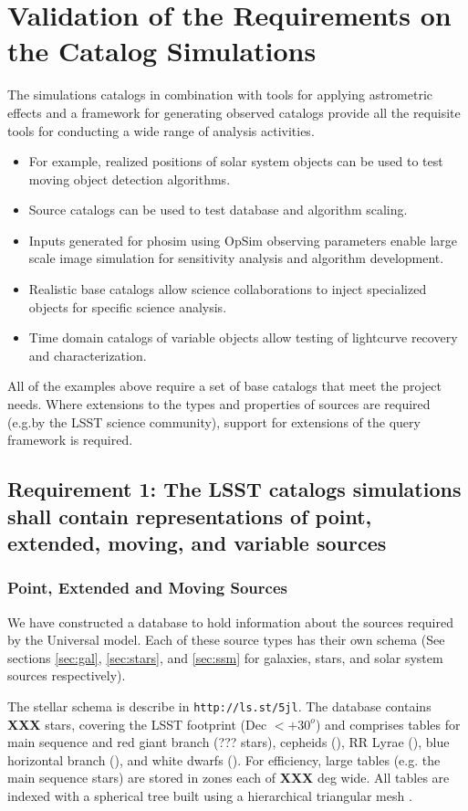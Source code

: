 \documentclass[]{article}
\begin{document}
{\section{Validation of the Requirements on the Catalog Simulations}
The simulations catalogs in combination with tools for applying astrometric effects and a 
framework for generating observed catalogs provide all the requisite tools for conducting a 
wide range of analysis activities.
\begin{itemize}
\item For example, realized positions of solar system objects can be used to test moving object detection algorithms.
\item Source catalogs can be used to test database and algorithm scaling.
\item Inputs generated for phosim using OpSim observing parameters enable large scale image simulation
for sensitivity analysis and algorithm development.
\item Realistic base catalogs allow science collaborations to inject specialized objects for specific science
analysis.
\item Time domain catalogs of variable objects allow testing of lightcurve recovery and characterization.
\end{itemize}

All of the examples above require a set of base catalogs that meet the project needs.  Where extensions to the types and
properties of sources are required (e.g.by the LSST science community), support for extensions of the query 
framework is required.  

\subsection{Requirement 1: The LSST catalogs simulations shall contain representations of point,
extended, moving, and variable sources}

\subsubsection{Point, Extended and Moving Sources}
We have constructed a database to hold information about the sources required by the Universal model.
Each of these source types has their own schema (See sections \ref{sec:gal}, \ref{sec:stars}, and \ref{sec:ssm} for galaxies, stars, and solar system sources respectively).

The stellar schema is describe in {\tt http://ls.st/5jl}.  The database contains {\bf XXX} stars, covering the LSST footprint (Dec $< +30^o$)
and comprises tables for main sequence and red giant branch (??? stars), cepheids (), RR Lyrae (), blue horizontal branch (), and white dwarfs ().
For efficiency, large tables (e.g. the main sequence stars) are stored in zones each of {\bf XXX} deg wide.  All tables are indexed with a spherical
tree built using a hierarchical triangular mesh \citep[HTM][]{htm}. 

}
\end{document}
